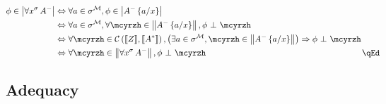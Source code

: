\documentclass{CSML}
\newcommand*\SortA{\sigma}
\newcommand*\LogSortedTerm[2]{#1^{#2}}
\newcommand*\LogVarA{x}
\newcommand*\LogNeg[1]{{#1^-}}
\newcommand*\LogFormA{A}
\newcommand*\LogSubst[1]{\left\{#1\right\}}
\newcommand*\ModM{\mathcal{M}}
\newcommand*\ModElemA{a}
\newcommand*\ModMInterp[1]{{#1}^\ModM}
\newcommand*\LmSortExtract{Z}
\newcommand*\LmInterpForm[1]{{#1}^*}
\newcommand*\CatC{\mathcal{C}}
\newcommand*\CatRCHomA\phi
\newcommand*\CatCHomA\mcyrzh
\newcommand*\CatInterpSortNeg[1]{{\left\llbracket#1\right\rrbracket}}
\newcommand*\RealValNeg[1]{\left\|#1\right\|}
\newcommand*\RealVal[1]{\left|#1\right|}
\begin{document}
\begin{itemize}
\begin{align*}
\CatRCHomA\in\RealVal{\forall\LogSortedTerm{\LogVarA}{\SortA}\,\LogNeg{\LogFormA}}&\Leftrightarrow\forall\ModElemA\in\ModMInterp{\SortA},\CatRCHomA\in\RealVal{\LogNeg{\LogFormA}\LogSubst{\ModElemA/\LogVarA}}\\
&\Leftrightarrow\forall\ModElemA\in\ModMInterp{\SortA},\forall\CatCHomA\in\RealValNeg{\LogNeg{\LogFormA}\LogSubst{\ModElemA/\LogVarA}},\CatRCHomA\ \bot\ \CatCHomA\\
&\Leftrightarrow\forall\CatCHomA\in\CatC\left(\CatInterpSortNeg{\LmSortExtract},\CatInterpSortNeg{\LmInterpForm{\LogFormA}}\right),\left(\exists\ModElemA\in\ModMInterp{\SortA},\CatCHomA\in\RealValNeg{\LogNeg{\LogFormA}\LogSubst{\ModElemA/\LogVarA}}\right)\Rightarrow\CatRCHomA\ \bot\ \CatCHomA\\
&\Leftrightarrow\forall\CatCHomA\in\RealValNeg{\forall\LogSortedTerm{\LogVarA}{\SortA}\,\LogNeg{\LogFormA}},\CatRCHomA\ \bot\ \CatCHomA\rlap{\hbox to204 pt{\hfill\qEd}}
\end{align*}
\end{itemize}
\subsection{Adequacy}
\end{document}
